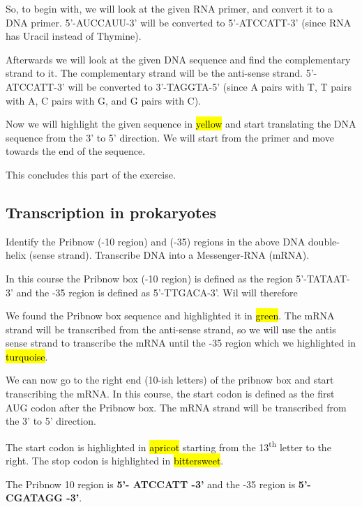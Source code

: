 \vspace{1em}

So, to begin with, we will look at the given RNA primer, and convert it to a DNA primer.
5'-AUCCAUU-3' will be converted to 5'-ATCCATT-3' (since RNA has Uracil instead of Thymine). 


Afterwards we will look at the given DNA sequence and find the complementary strand to it. The complementary strand will be the anti-sense strand. 5'-ATCCATT-3' will be converted to 3'-TAGGTA-5' (since A pairs with T, T pairs with A, C pairs with G, and G pairs with C).


Now we will highlight the given sequence in \hl{yellow} and start translating the DNA sequence from the 3' to 5' direction. We will start from the primer and move towards the end of the sequence.

\vspace{1em}
This concludes this part of the exercise.

\subsection{Transcription in prokaryotes}
Identify the Pribnow (-10 region) and (-35) regions in the above DNA double-helix (sense strand). Transcribe DNA into a Messenger-RNA (mRNA).

\vspace{1em}
In this course the Pribnow box (-10 region) is defined as the region 5’-TATAAT-3’ and the -35 region is defined as 5’-TTGACA-3’. Wil will therefore 

We found the Pribnow box sequence and highlighted it in \hl{green}. The mRNA strand will be transcribed from the anti-sense strand, so we will use the antis sense strand to transcribe the mRNA until the -35 region which we highlighted in \hl{turquoise}.


We can now go to the right end (10-ish letters) of the pribnow box and start transcribing the mRNA. In this course, the start codon is defined as the first AUG codon after the Pribnow box. The mRNA strand will be transcribed from the 3' to 5' direction.

The start codon is highlighted in \hl{apricot} starting from the 13\textsuperscript{th} letter to the right. The stop codon is highlighted in \hl{bittersweet}.


The Pribnow 10 region is \textbf{5’- ATCCATT -3’} and the -35 region is \textbf{5’- CGATAGG -3’}.

